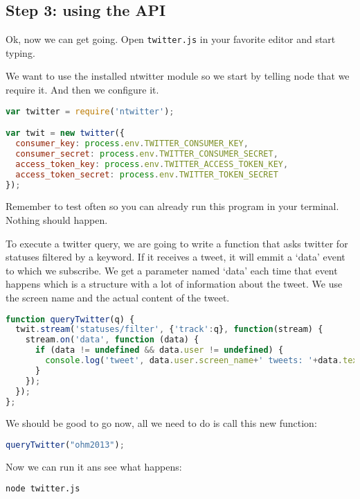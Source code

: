 \documentclass[a4paper]{report}
\begin{document}
\subsection*{Step 3: using the API}
Ok, now we can get going. Open \texttt{twitter.js} in your favorite editor and start typing.

We want to use the installed ntwitter module so we start by telling node that we require it. And then we configure it.

\begin{lstlisting}[language=JavaScript]
var twitter = require('ntwitter');

var twit = new twitter({
  consumer_key: process.env.TWITTER_CONSUMER_KEY,
  consumer_secret: process.env.TWITTER_CONSUMER_SECRET,
  access_token_key: process.env.TWITTER_ACCESS_TOKEN_KEY,
  access_token_secret: process.env.TWITTER_TOKEN_SECRET
});
\end{lstlisting}

\noindent Remember to test often so you can already run this program in your terminal. Nothing should happen.

\noindent To execute a twitter query, we are going to write a function that asks twitter for statuses filtered by a keyword. If it receives a tweet, it will emmit a `data' event to which we subscribe. We get a parameter named `data' each time that event happens which is a structure with a lot of information about the tweet. We use the screen name and the actual content of the tweet.

\begin{lstlisting}[language=JavaScript]
function queryTwitter(q) { 
  twit.stream('statuses/filter', {'track':q}, function(stream) {
    stream.on('data', function (data) {
      if (data != undefined && data.user != undefined) {
        console.log('tweet', data.user.screen_name+' tweets: '+data.text);
      }
    });
  });
};
\end{lstlisting}

\noindent We should be good to go now, all we need to do is call this new function:

\begin{lstlisting}[language=JavaScript]
queryTwitter("ohm2013");
\end{lstlisting}

\noindent Now we can run it ans see what happens:
\begin{lstlisting}[language=bash]
node twitter.js
\end{lstlisting}
\end{document}
